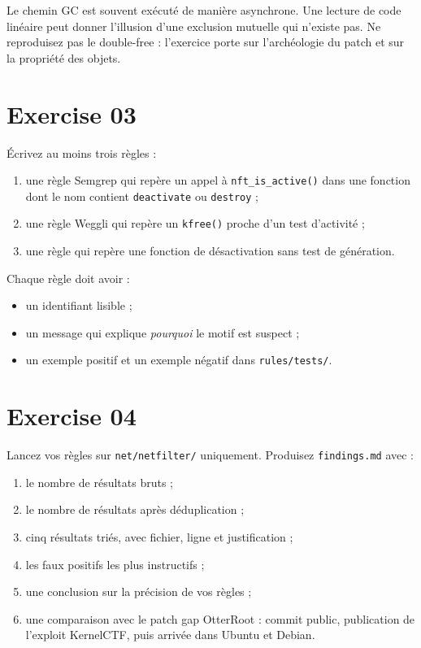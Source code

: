 \documentclass{training}
\begin{document}
\begin{warn}
Le chemin GC est souvent exécuté de manière asynchrone. Une lecture de code
linéaire peut donner l'illusion d'une exclusion mutuelle qui n'existe pas.
Ne reproduisez pas le double-free : l'exercice porte sur l'archéologie du
patch et sur la propriété des objets.
\end{warn}

\chapter{Exercise 03}
\makeheaderfiles

Écrivez au moins trois règles :

\begin{enumerate}
  \item une règle Semgrep qui repère un appel à
        \texttt{nft\_is\_active()} dans une fonction dont le nom contient
        \texttt{deactivate} ou \texttt{destroy} ;
  \item une règle Weggli qui repère un \texttt{kfree()} proche d'un test
        d'activité ;
  \item une règle qui repère une fonction de désactivation sans test de
        génération.
\end{enumerate}

Chaque règle doit avoir :

\begin{itemize}
  \item un identifiant lisible ;
  \item un message qui explique \emph{pourquoi} le motif est suspect ;
  \item un exemple positif et un exemple négatif dans
        \texttt{rules/tests/}.
\end{itemize}

\chapter{Exercise 04}
\makeheaderfiles

Lancez vos règles sur \texttt{net/netfilter/} uniquement. Produisez
\texttt{findings.md} avec :

\begin{enumerate}
  \item le nombre de résultats bruts ;
  \item le nombre de résultats après déduplication ;
  \item cinq résultats triés, avec fichier, ligne et justification ;
  \item les faux positifs les plus instructifs ;
  \item une conclusion sur la précision de vos règles ;
  \item une comparaison avec le patch gap OtterRoot : commit public,
        publication de l'exploit KernelCTF, puis arrivée dans Ubuntu et
        Debian.
\end{enumerate}
\end{document}
